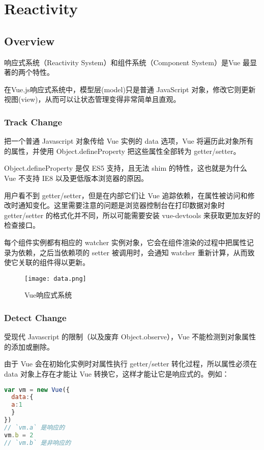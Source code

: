 \part{Reactivity}


\chapter{Overview}


响应式系统（Reactivity System）和组件系统（Component System）是Vue 最显著的两个特性。

在Vue.js响应式系统中，模型层(model)只是普通 JavaScript 对象，修改它则更新视图(view)，从而可以让状态管理变得非常简单且直观。


\section{Track Change}

把一个普通 Javascript 对象传给 Vue 实例的 data 选项，Vue 将遍历此对象所有的属性，并使用 Object.defineProperty 把这些属性全部转为 getter/setter。

Object.defineProperty 是仅 ES5 支持，且无法 shim 的特性，这也就是为什么 Vue 不支持 IE8 以及更低版本浏览器的原因。


用户看不到 getter/setter，但是在内部它们让 Vue 追踪依赖，在属性被访问和修改时通知变化。这里需要注意的问题是浏览器控制台在打印数据对象时 getter/setter 的格式化并不同，所以可能需要安装 vue-devtools 来获取更加友好的检查接口。

每个组件实例都有相应的 watcher 实例对象，它会在组件渲染的过程中把属性记录为依赖，之后当依赖项的 setter 被调用时，会通知 watcher 重新计算，从而致使它关联的组件得以更新。

\begin{figure}[htbp]
\centering
\texttt{[image: data.png]}
\caption{Vue响应式系统}
\end{figure}


\section{Detect Change}

受现代 Javascript 的限制（以及废弃 Object.observe），Vue 不能检测到对象属性的添加或删除。

由于 Vue 会在初始化实例时对属性执行 getter/setter 转化过程，所以属性必须在 data 对象上存在才能让 Vue 转换它，这样才能让它是响应式的。例如：



\begin{lstlisting}[language=JavaScript]
var vm = new Vue({
  data:{
  a:1
  }
})
// `vm.a` 是响应的
vm.b = 2
// `vm.b` 是非响应的
\end{lstlisting}

